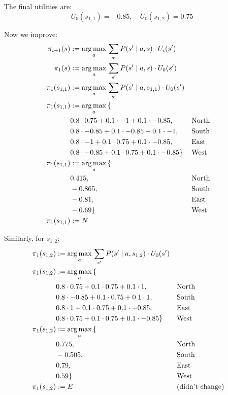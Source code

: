 The final utilities are:
\begin{equation*}
    U_0(s_{1,1}) = -0.85, \quad U_0(s_{1,2}) = 0.75
\end{equation*}

Now we improve:
\begin{align*}
\pi_{i+1}(s) &:= \mathop{\mathrm{arg\,max}}_{a}\, \sum_{s'} P(s' \mid a,s) \cdot U_i(s') \\
\pi_{1}(s) &:= \mathop{\mathrm{arg\,max}}_{a}\, \sum_{s'} P(s' \mid a,s) \cdot U_0(s') \\
\pi_{1}(s_{1,1}) &:= \mathop{\mathrm{arg\,max}}_{a}\, \sum_{s'} P(s' \mid a,s_{1,1}) \cdot U_0(s') \\
\pi_{1}(s_{1,1}) &:= \mathop{\mathrm{arg\,max}}_{a}\, \{ \\
&0.8 \cdot 0.75 + 0.1 \cdot -1 + 0.1 \cdot -0.85 , && \text{North} \\
&0.8 \cdot -0.85 + 0.1 \cdot -0.85 + 0.1 \cdot -1 ,  && \text{South} \\
&0.8 \cdot -1 + 0.1 \cdot 0.75 + 0.1 \cdot -0.85 ,  && \text{East} \\
&0.8 \cdot -0.85 + 0.1 \cdot 0.75 + 0.1 \cdot -0.85 \} && \text{West} \\
\pi_{1}(s_{1,1}) &:= \mathop{\mathrm{arg\,max}}_{a}\, \{ \\
&0.415 , && \text{North} \\
&-0.865 ,  && \text{South} \\
&-0.81 ,  && \text{East} \\
&-0.69 \} && \text{West} \\
\pi_{1}(s_{1,1}) &:= N
\end{align*}

Similarly, for $s_{1,2}$:
\begin{align*}
\pi_{1}(s_{1,2}) &:= \mathop{\mathrm{arg\,max}}_{a}\, \sum_{s'} P(s' \mid a,s_{1,2}) \cdot U_0(s') \\
\pi_{1}(s_{1,2}) &:= \mathop{\mathrm{arg\,max}}_{a}\, \{ \\
&0.8 \cdot 0.75 + 0.1 \cdot 0.75 + 0.1 \cdot 1 , && \text{North} \\
&0.8 \cdot -0.85 + 0.1 \cdot 0.75 + 0.1 \cdot 1 ,  && \text{South} \\
&0.8 \cdot 1 + 0.1 \cdot 0.75 + 0.1 \cdot -0.85 ,  && \text{East} \\
&0.8 \cdot 0.75 + 0.1 \cdot 0.75 + 0.1 \cdot -0.85 \} && \text{West} \\
\pi_{1}(s_{1,2}) &:= \mathop{\mathrm{arg\,max}}_{a}\, \{ \\
&0.775 , && \text{North} \\
&-0.505 ,  && \text{South} \\
&0.79 ,  && \text{East} \\
&0.59 \} && \text{West} \\
\pi_{1}(s_{1,2}) &:= E && (\text{didn't change})
\end{align*}

